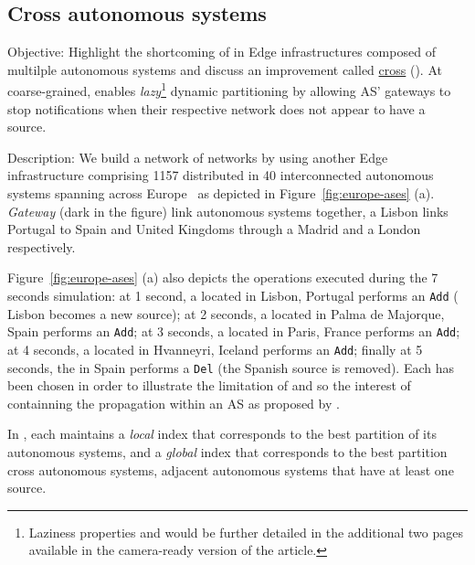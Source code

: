 \subsection{Cross autonomous systems}
\begin{asparadesc}
  \item[Objective:] Highlight the shortcoming of \NAME in Edge
    infrastructures composed of multilple autonomous systems and
    discuss an improvement called \underline{cross} \underline{\NAME}
    (\NAMEC). At coarse-grained, \NAMEC enables
    \emph{lazy}\footnote{Laziness properties and \NAMEC would be
    further detailed in the  additional two pages available in the
    camera-ready version of the article.} dynamic partitioning by
    allowing AS' gateways to stop notifications when their respective
    network does not appear to have a source.
    
  \item[Description:] We build a network of networks by using another
    Edge infrastructure comprising 1157 \processes distributed in 40
    interconnected autonomous systems spanning across
    Europe~\cite{knight2011internet} 
     as depicted in Figure~\ref{fig:europe-ases} (a). \emph{Gateway} \processes (dark in
    the figure) link autonomous systems together, \eg a Lisbon \node
    links Portugal to Spain and United Kingdoms through a Madrid \node
    and a London \node respectively.

    \noindent Figure~\ref{fig:europe-ases} (a) also depicts the
    operations executed during the 7 seconds simulation: at 1 second,
    a \node located in Lisbon, Portugal performs an \texttt{Add} (\ie
    Lisbon becomes a new source); at 2 seconds, a \node located in
    Palma de Majorque, Spain performs an \texttt{Add}; at 3 seconds, a
    \node located in Paris, France performs an \texttt{Add}; at 4
    seconds, a \node located in Hvanneyri, Iceland performs an
    \texttt{Add}; finally at 5 seconds, the \node in Spain performs a
    \texttt{Del} (the Spanish source is removed). Each \node has been
    chosen in order to illustrate the limitation of \NAME and so the
    interest of containning the propagation within an AS as proposed by
    \NAMEC.
    
    \noindent In \NAMEC, each
    \process maintains a \emph{local} index that corresponds to the
    best partition of its autonomous systems, and a \emph{global}
    index that corresponds to the best partition cross autonomous
    systems, \ie adjacent autonomous systems that have at least one
    source.
    

\end{asparadesc}
